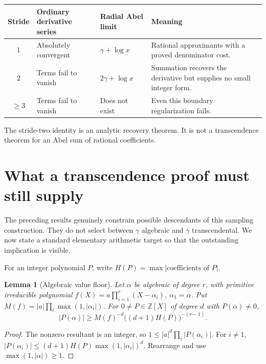 \documentclass[11pt,a4paper]{article}
\newcommand{\Z}{\mathbb Z}
\newtheorem{lemma}[theorem]{Lemma}
\theoremstyle{definition}
\theoremstyle{remark}
\numberwithin{equation}{section}
\begin{document}
\begin{center}\small
\begin{tabularx}{\linewidth}{@{}cXXX@{}}
\toprule
Stride & Ordinary derivative series & Radial Abel limit & Meaning \\
\midrule
$1$ & Absolutely convergent & $\gamma+\log x$ & Rational approximants
with a proved denominator cost. \\
$2$ & Terms fail to vanish & $2\gamma+\log x$ & Summation recovers the
derivative but supplies no small integer form. \\
$\ge3$ & Terms fail to vanish & Does not exist & Even this boundary
regularization fails. \\
\bottomrule
\end{tabularx}
\end{center}
The stride-two identity is an analytic recovery theorem. It is not a
transcendence theorem for an Abel sum of rational coefficients.

\section{What a transcendence proof must still supply}
\label{sample:sec:target}
The preceding results genuinely constrain possible descendants of this
sampling construction. They do not select between $\gamma$ algebraic
and $\gamma$ transcendental. We now state a standard elementary
arithmetic target so that the outstanding implication is visible.

For an integer polynomial $P$, write
$H(P)=\max|\text{coefficients of }P|$.

\begin{lemma}[Algebraic value floor]\label{sample:lem:floor}
Let $\alpha$ be algebraic of degree $r$, with primitive irreducible
polynomial $f(X)=a\prod_{i=1}^r(X-\alpha_i)$, $\alpha_1=\alpha$.
Put $M(f)=|a|\prod_i\max(1,|\alpha_i|)$.
For $0\ne P\in\Z[X]$ of degree $d$ with $P(\alpha)\ne0$,
\begin{equation}\label{sample:eq:floor}
|P(\alpha)|\ge M(f)^{-d}\bigl((d+1)H(P)\bigr)^{-(r-1)}.
\end{equation}
\end{lemma}
\begin{proof}
The nonzero resultant is an integer, so
$1\le|a|^d\prod_i|P(\alpha_i)|$.
For $i\ne1$,
$|P(\alpha_i)|\le(d+1)H(P)\max(1,|\alpha_i|)^d$.
Rearrange and use $\max(1,|\alpha|)\ge1$.
\end{proof}
\end{document}
